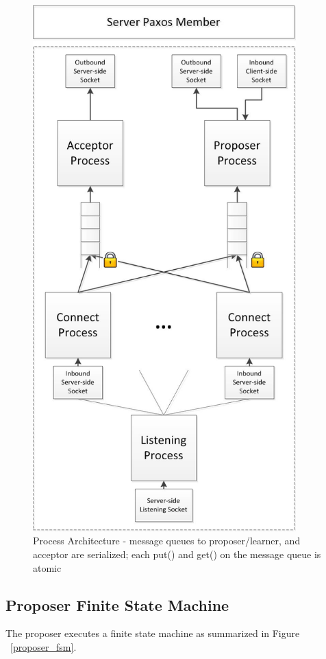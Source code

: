 \documentclass{article}
\begin{document}
\begin{figure}
\centering
\includegraphics[width=4in]{paxos_member_architecture.jpg}
\caption{Process Architecture - message queues to proposer/learner, and acceptor are serialized; each put() and get() on the message queue is atomic}
\label{paxos_member}
\end{figure}

\subsection{Proposer Finite State Machine}

The proposer executes a finite state machine as summarized in Figure ~\ref{proposer_fsm}.
\end{document}
